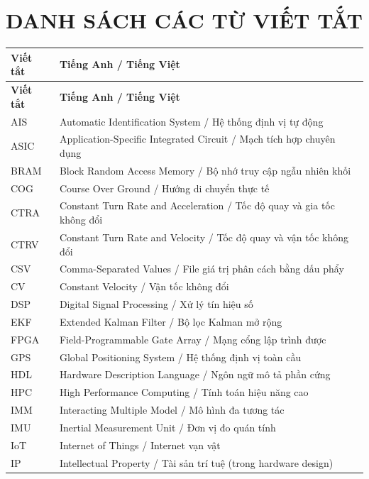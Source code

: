 \newpage
\section*{DANH SÁCH CÁC TỪ VIẾT TẮT}

\begin{longtable}{|p{3cm}|p{10cm}|}
\hline
\textbf{Viết tắt} & \textbf{Tiếng Anh / Tiếng Việt} \\
\hline
\endfirsthead

\hline
\textbf{Viết tắt} & \textbf{Tiếng Anh / Tiếng Việt} \\
\hline
\endhead

\hline
\endfoot

AIS & Automatic Identification System / Hệ thống định vị tự động \\
\hline
ASIC & Application-Specific Integrated Circuit / Mạch tích hợp chuyên dụng \\
\hline
BRAM & Block Random Access Memory / Bộ nhớ truy cập ngẫu nhiên khối \\
\hline
COG & Course Over Ground / Hướng di chuyển thực tế \\
\hline
CTRA & Constant Turn Rate and Acceleration / Tốc độ quay và gia tốc không đổi \\
\hline
CTRV & Constant Turn Rate and Velocity / Tốc độ quay và vận tốc không đổi \\
\hline
CSV & Comma-Separated Values / File giá trị phân cách bằng dấu phẩy \\
\hline
CV & Constant Velocity / Vận tốc không đổi \\
\hline
DSP & Digital Signal Processing / Xử lý tín hiệu số \\
\hline
EKF & Extended Kalman Filter / Bộ lọc Kalman mở rộng \\
\hline
FPGA & Field-Programmable Gate Array / Mạng cổng lập trình được \\
\hline
GPS & Global Positioning System / Hệ thống định vị toàn cầu \\
\hline
HDL & Hardware Description Language / Ngôn ngữ mô tả phần cứng \\
\hline
HPC & High Performance Computing / Tính toán hiệu năng cao \\
\hline
IMM & Interacting Multiple Model / Mô hình đa tương tác \\
\hline
IMU & Inertial Measurement Unit / Đơn vị đo quán tính \\
\hline
IoT & Internet of Things / Internet vạn vật \\
\hline
IP & Intellectual Property / Tài sản trí tuệ (trong hardware design) \\

\end{longtable}
